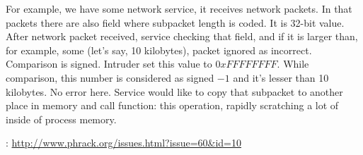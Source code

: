 {For example, we have some network service, it receives network packets. 
In that packets there are also field where subpacket length is coded. 
It is 32-bit value. 
After network packet received, service checking that field, and if it is larger than, 
for example, some  (let's say, 10 kilobytes), packet ignored as incorrect. 
Comparison is signed. Intruder set this value to $0xFFFFFFFF$.
While comparison, this number is considered as signed $-1$ and it's lesser than 10 kilobytes. 
No error here. 
Service would like to copy that subpacket to another place in memory and call 
 function: this operation, rapidly scratching a lot of 
inside of process memory.}

: \url{http://www.phrack.org/issues.html?issue=60&id=10}

